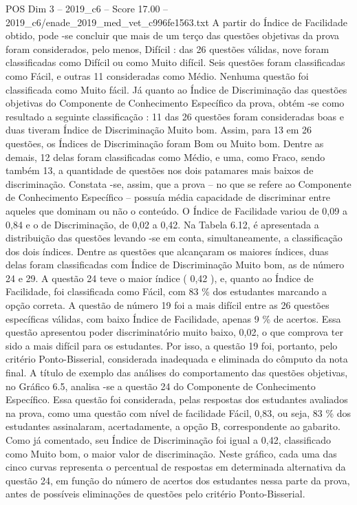 \begin{textsample}{POS Dim 3 – 2019\_c6 – Score 17.00 – 2019\_c6/enade\_2019\_med\_vet\_c996fe1563.txt}
A partir do Índice de Facilidade obtido, pode -se concluir que mais de um terço das questões objetivas da prova foram considerados, pelo menos, Difícil : das 26 questões válidas, nove foram classificadas como Difícil ou como Muito difícil.
Seis questões foram classificadas como Fácil, e outras 11 consideradas como Médio.
Nenhuma questão foi classificada como Muito fácil.
Já quanto ao Índice de Discriminação das questões objetivas do Componente de Conhecimento Específico da prova, obtém -se como resultado a seguinte classificação : 11 das 26 questões foram consideradas boas e duas tiveram Índice de Discriminação Muito bom.
Assim, para 13 em 26 questões, os Índices de Discriminação foram Bom ou Muito bom.
Dentre as demais, 12 delas foram classificadas como Médio, e uma, como Fraco, sendo também 13, a quantidade de questões nos dois patamares mais baixos de discriminação.
Constata -se, assim, que a prova – no que se refere ao Componente de Conhecimento Específico – possuía média capacidade de discriminar entre aqueles que dominam ou não o conteúdo.
O Índice de Facilidade variou de 0,09 a 0,84 e o de Discriminação, de 0,02 a 0,42.
Na Tabela 6.12, é apresentada a distribuição das questões levando -se em conta, simultaneamente, a classificação dos dois índices.
Dentre as questões que alcançaram os maiores índices, duas delas foram classificadas com Índice de Discriminação Muito bom, as de número 24 e 29.
A questão 24 teve o maior índice ( 0,42 ), e, quanto ao Índice de Facilidade, foi classificada como Fácil, com 83 \% dos estudantes marcando a opção correta.
A questão de número 19 foi a mais difícil entre as 26 questões específicas válidas, com baixo Índice de Facilidade, apenas 9 \% de acertos.
Essa questão apresentou poder discriminatório muito baixo, 0,02, o que comprova ter sido a mais difícil para os estudantes.
Por isso, a questão 19 foi, portanto, pelo critério Ponto-Bisserial, considerada inadequada e eliminada do cômputo da nota final.
A título de exemplo das análises do comportamento das questões objetivas, no Gráfico 6.5, analisa -se a questão 24 do Componente de Conhecimento Específico.
Essa questão foi considerada, pelas respostas dos estudantes avaliados na prova, como uma questão com nível de facilidade Fácil, 0,83, ou seja, 83 \% dos estudantes assinalaram, acertadamente, a opção B, correspondente ao gabarito.
Como já comentado, seu Índice de Discriminação foi igual a 0,42, classificado como Muito bom, o maior valor de discriminação.
Neste gráfico, cada uma das cinco curvas representa o percentual de respostas em determinada alternativa da questão 24, em função do número de acertos dos estudantes nessa parte da prova, antes de possíveis eliminações de questões pelo critério Ponto-Bisserial.

\end{textsample}
